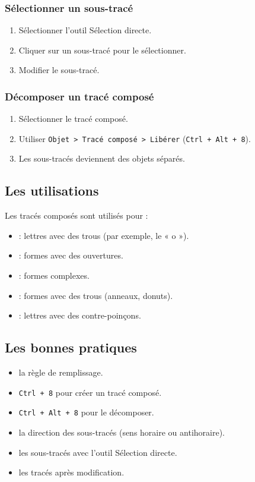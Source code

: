 \subsubsection{Sélectionner un sous-tracé}

\begin{enumerate}
    \item Sélectionner l'outil Sélection directe.
    \item Cliquer sur un sous-tracé pour le sélectionner.
    \item Modifier le sous-tracé.
\end{enumerate}

\subsubsection{Décomposer un tracé composé}

\begin{enumerate}
    \item Sélectionner le tracé composé.
    \item Utiliser \texttt{Objet > Tracé composé > Libérer} (\texttt{Ctrl + Alt + 8}).
    \item Les sous-tracés deviennent des objets séparés.
\end{enumerate}

\subsection{Les utilisations}

Les tracés composés sont utilisés pour :

\begin{itemize}
    \item {} : lettres avec des trous (par exemple, le « o »).
    \item {} : formes avec des ouvertures.
    \item {} : formes complexes.
    \item {} : formes avec des trous (anneaux, donuts).
    \item {} : lettres avec des contre-poinçons.
\end{itemize}

\subsection{Les bonnes pratiques}

\begin{itemize}
    \item {} la règle de remplissage.
    \item {} \texttt{Ctrl + 8} pour créer un tracé composé.
    \item {} \texttt{Ctrl + Alt + 8} pour le décomposer.
    \item {} la direction des sous-tracés (sens horaire ou antihoraire).
    \item {} les sous-tracés avec l'outil Sélection directe.
    \item {} les tracés après modification.
\end{itemize}

